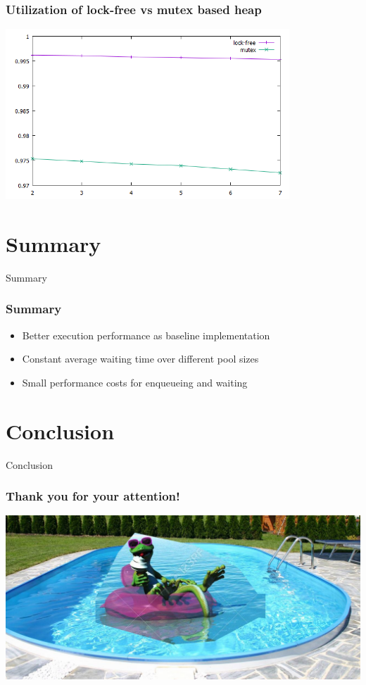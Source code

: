 \documentclass{beamer}
\begin{document}
\begin{frame}
	\frametitle{Utilization of lock-free vs mutex based heap}
	\begin{center}
		\includegraphics[width=0.8\textwidth]{img/lock_free.png}
	\end{center}

\end{frame}

\section{Summary}
\begin{frame}
	\begin{center}
		\huge Summary
	\end{center}
\end{frame}

\begin{frame}
	\frametitle{Summary}
	\begin{itemize}
		\item Better execution performance as baseline implementation
		\item Constant average waiting time over different pool sizes
		\item Small performance costs for enqueueing and waiting
	\end{itemize}
\end{frame}

\section{Conclusion}
	\begin{frame}
	\begin{center}
		\huge Conclusion
	\end{center}
\end{frame}



\begin{frame}
    \frametitle{Thank you for your attention!}
 	\includegraphics[width=\textwidth]{img/important.jpg}
\end{frame}
\end{document}
